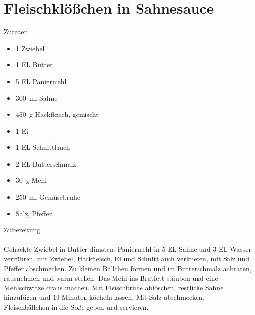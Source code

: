 \section*{Fleischklößchen in Sahnesauce}
\ihead{}\ohead{}
\cfoot{}
{\Large Zutaten}
\begin{multicols}{2}
\begin{itemize}
    \item \num{1} Zwiebel
    \item \num{1} EL Butter
    \item \num{5} EL Paniermehl
    \item \SI{300}{ml} Sahne
    \item \SI{450}{g} Hackfleisch, gemischt
    \item \num{1} Ei
    \item \num{1} EL Schnittlauch
    \item \num{2} EL Butterschmalz
    \item \SI{30}{g} Mehl
    \item \SI{250}{ml} Gemüsebruhe
    \item Salz, Pfeffer
\end{itemize}
\end{multicols}
\noindent
{\Large Zubereitung}\\
\\
Gehackte Zwiebel in Butter dünsten. 
Paniermehl in 5 EL Sahne und 3 EL Wasser verrühren, mit Zwiebel, Hackfleisch, Ei und Schnittlauch verkneten, mit Salz und Pfeffer abschmecken. 
Zu kleinen Bällchen formen und im Butterschmalz anbraten, rausnehmen und warm stellen. 
Das Mehl ins Bratfett stäuben und eine Mehlschwitze draus machen. 
Mit Fleischbrühe ablöschen, restliche Sahne hinzufügen und 10 Minuten köcheln lassen. 
Mit Salz abschmecken. 
Fleischbällchen in die Soße geben und servieren.
